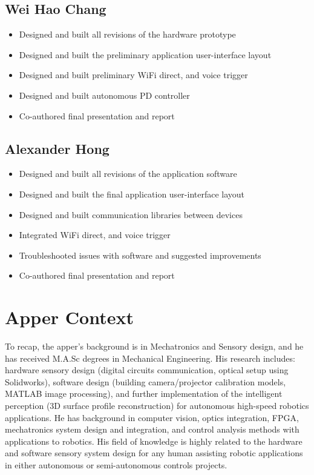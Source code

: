 \documentclass[12pt]{article}
\begin{document}
\subsection{Wei Hao Chang}
\begin{itemize}
\item Designed and built all revisions of the hardware prototype
\item Designed and built the preliminary application user-interface layout
\item Designed and built preliminary WiFi direct, and voice trigger
\item Designed and built autonomous PD controller
\item Co-authored final presentation and report
\end{itemize}
\subsection{Alexander Hong}
\begin{itemize}
\item Designed and built all revisions of the application software
\item Designed and built the final application user-interface layout
\item Designed and built communication libraries between devices
\item Integrated WiFi direct, and voice trigger
\item Troubleshooted  issues with software and suggested improvements
\item Co-authored final presentation and report
\end{itemize}

\section{Apper Context}
To recap, the apper's background is in Mechatronics and Sensory design, and he has received M.A.Sc degrees in Mechanical Engineering. His research includes: hardware sensory design (digital circuits communication, optical setup using Solidworks), software design (building camera/projector calibration models, MATLAB image processing), and further implementation of the intelligent perception (3D surface profile reconstruction) for autonomous high-speed robotics applications. He has background in computer vision, optics integration, FPGA, mechatronics system design and integration, and control analysis methods with applications to robotics. His field of knowledge is highly related to the hardware and software sensory system design for any human assisting robotic applications in either autonomous or semi-autonomous controls projects.
\end{document}
